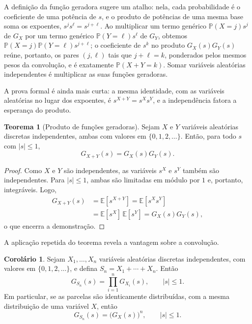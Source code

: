 \documentclass[12pt,portuguese]{article}
\theoremstyle{definition}
\newtheorem{theorem}{Teorema}
\newtheorem{corollary}[corollary]{Corolário}
\theoremstyle{plainexercise}
\theoremstyle{starredexercise}
\theoremstyle{definition}
\begin{document}
A definição da função geradora sugere um atalho: nela, cada probabilidade
é o coeficiente de uma potência de $s$, e o produto de potências de uma
mesma base soma os expoentes, $s^js^\ell=s^{j+\ell}$. Ao multiplicar um
termo genérico $\mathbb{P}(X=j)s^j$ de $G_X$ por um termo genérico
$\mathbb{P}(Y=\ell)s^\ell$ de $G_Y$, obtemos
$\mathbb{P}(X=j)\mathbb{P}(Y=\ell)s^{j+\ell}$; o coeficiente de $s^k$ no
produto $G_X(s)G_Y(s)$ reúne, portanto, os pares $(j,\ell)$ tais que
$j+\ell=k$, ponderados pelos mesmos pesos da convolução, e é exatamente
$\mathbb{P}(X+Y=k)$. Somar variáveis aleatórias independentes é
multiplicar as suas funções geradoras.

A prova formal é ainda mais curta: a mesma identidade, com as variáveis
aleatórias no lugar dos expoentes, é $s^{X+Y}=s^Xs^Y$, e a independência
fatora a esperança do produto.

\begin{theorem}[Produto de funções geradoras]\label{thm:fgp-produto}
Sejam $X$ e $Y$ variáveis aleatórias discretas independentes, ambas com
valores em $\{0,1,2,\ldots\}$. Então, para todo $s$ com $|s|\leqslant 1$,
\[
G_{X+Y}(s)=G_X(s)G_Y(s).
\]
\end{theorem}

\begin{proof}
Como $X$ e $Y$ são independentes, as variáveis $s^X$ e $s^Y$ também são
independentes. Para $|s|\leqslant 1$, ambas são limitadas em módulo por $1$
e, portanto, integráveis.
Logo,
\begin{align*}
G_{X+Y}(s)
&=\mathbb{E}[s^{X+Y}]
=\mathbb{E}[s^Xs^Y]
\\[0.2cm]
&=\mathbb{E}[s^X]\,\mathbb{E}[s^Y]
=G_X(s)G_Y(s),
\end{align*}
o que encerra a demonstração.
\end{proof}

A aplicação repetida do teorema revela a vantagem sobre a convolução.

\begin{corollary}\label{cor:fgp-soma-finita}
Sejam $X_1,\ldots,X_n$ variáveis aleatórias discretas independentes, com valores
em $\{0,1,2,\ldots\}$, e defina $S_n=X_1+\cdots+X_n$. Então
\[
G_{S_n}(s)=\prod_{i=1}^{n}G_{X_i}(s),
\qquad |s|\leqslant 1.
\]
Em particular, se as parcelas são identicamente distribuídas, com a mesma
distribuição de uma variável $X$, então
\begin{equation}\label{eq:fgp-soma-finita-iid}
G_{S_n}(s)=\bigl(G_X(s)\bigr)^n,
\qquad |s|\leqslant 1.
\end{equation}
\end{corollary}
\end{document}
